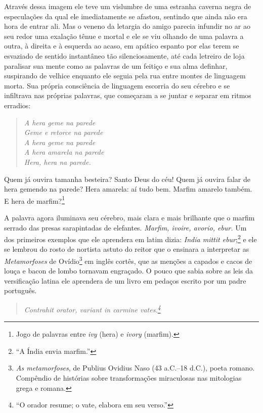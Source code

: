 Através dessa imagem ele teve um vislumbre de uma estranha caverna negra
de especulações da qual ele imediatamente se afastou, sentindo que
ainda não era hora de entrar ali. Mas o veneno da letargia do amigo
parecia infundir no ar ao seu redor uma exalação tênue e mortal e ele
se viu olhando de uma palavra a outra, à direita e à esquerda ao acaso,
em apático espanto por elas terem se esvaziado de sentido instantâneo
tão silenciosamente, até cada letreiro de loja paralisar sua mente como
as palavras de um feitiço e sua alma definhar, suspirando de velhice
enquanto ele seguia pela rua entre montes de linguagem morta. Sua
própria consciência de linguagem escorria do seu cérebro e se
infiltrava nas próprias palavras, que começaram a se juntar e separar
em ritmos erradios:

\begin{verse}\itshape
A hera geme na parede\\
Geme e retorce na parede\\
A hera geme na parede\\
A hera amarela na parede\\
Hera, hera na parede.
\end{verse}

Quem já ouvira tamanha besteira? Santo Deus do céu! Quem já ouvira falar
de hera gemendo na parede? Hera amarela: aí tudo bem. Marfim amarelo
também. E hera de marfim?\footnote{ Jogo de palavras entre
\textit{ivy} (hera) e \textit{ivory} (marfim).}

A palavra agora iluminava seu cérebro, mais clara e mais brilhante que o marfim
serrado das presas sarapintadas de elefantes. \textit{Marfim, ivoire, avorio,
ebur.} Um dos primeiros exemplos que ele aprendera em latim dizia: \textit{India
mittit ebur};\footnote{ “A Índia envia marfim.”} e ele se lembrou do rosto de
nortista astuto do reitor que o ensinara a interpretar as \textit{Metamorfoses}
de Ovídio\footnote{ \textit{As metamorfoses}, de Publius Ovidius Naso (43 a.C.--18 
d.C.), poeta romano. Compêndio de histórias sobre transformações
miraculosas nas mitologias grega e romana.} em inglês cortês, que as menções a
capados e cacos de louça e bacon de lombo tornavam engraçado. O pouco que sabia
sobre as leis da versificação latina ele aprendera de um livro em pedaços
escrito por um padre português.

\begin{quote}\itshape 
Contrahit orator, variant in carmine vates.\footnote{ “O orador
resume; o vate, elabora em seu verso.”}
\end{quote}

